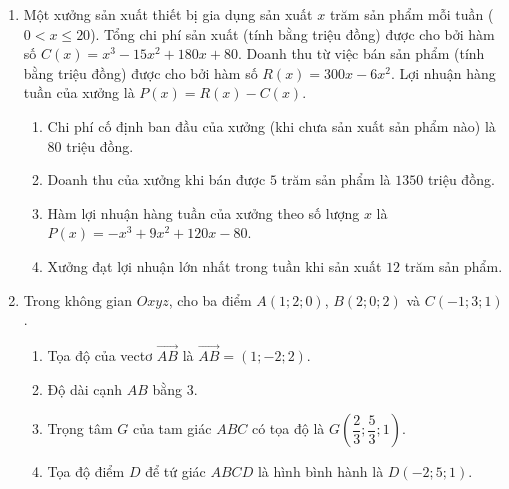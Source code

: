 \documentclass[12pt,a4paper]{article}
\begin{document}
\newpage
\begin{enumerate}[start=2]
\item Một xưởng sản xuất thiết bị gia dụng sản xuất $x$ trăm sản phẩm mỗi tuần ($0 < x \le 20$). Tổng chi phí sản xuất (tính bằng triệu đồng) được cho bởi hàm số $C(x)=x^3-15x^2+180x+80$. Doanh thu từ việc bán sản phẩm (tính bằng triệu đồng) được cho bởi hàm số $R(x)=300x-6x^2$. Lợi nhuận hàng tuần của xưởng là $P(x)=R(x)-C(x)$.
\begin{enumerate}
\item Chi phí cố định ban đầu của xưởng (khi chưa sản xuất sản phẩm nào) là $80$ triệu đồng.
\item Doanh thu của xưởng khi bán được $5$ trăm sản phẩm là $1350$ triệu đồng.
\item Hàm lợi nhuận hàng tuần của xưởng theo số lượng $x$ là $P(x)=-x^3+9x^2+120x-80$.
\item Xưởng đạt lợi nhuận lớn nhất trong tuần khi sản xuất $12$ trăm sản phẩm.
\end{enumerate}

\item Trong không gian $Oxyz$, cho ba điểm $A(1;2;0)$, $B(2;0;2)$ và $C(-1;3;1)$.
\begin{enumerate}
\item Tọa độ của vectơ $\vec{AB}$ là $\vec{AB}=(1;-2;2)$.
\item Độ dài cạnh $AB$ bằng $3$.
\item Trọng tâm $G$ của tam giác $ABC$ có tọa độ là $G\left(\dfrac{2}{3};\dfrac{5}{3};1\right)$.
\item Tọa độ điểm $D$ để tứ giác $ABCD$ là hình bình hành là $D(-2;5;1)$.
\end{enumerate}


\end{enumerate}
\end{document}
